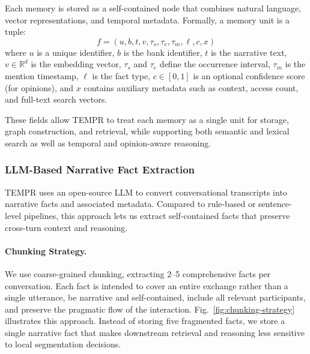 

Each memory is stored as a self-contained node that combines natural language, vector representations, and temporal metadata. Formally, a memory unit is a tuple:
\begin{equation}
f = (u, b, t, v, \tau_s, \tau_e, \tau_m, \ell, c, x)
\end{equation}
where $u$ is a unique identifier, $b$ is the bank identifier, $t$ is the narrative text, $v \in \mathbb{R}^d$ is the embedding vector, $\tau_s$ and $\tau_e$ define the occurrence interval, $\tau_m$ is the mention timestamp, $\ell$ is the fact type, $c \in [0,1]$ is an optional confidence score (for opinions), and $x$ contains auxiliary metadata such as context, access count, and full-text search vectors.

These fields allow TEMPR to treat each memory as a single unit for storage, graph construction, and retrieval, while supporting both semantic and lexical search as well as temporal and opinion-aware reasoning.

\subsubsection{LLM-Based Narrative Fact Extraction}

TEMPR uses an open-source LLM to convert conversational transcripts into narrative facts and associated metadata. Compared to rule-based or sentence-level pipelines, this approach lets us extract self-contained facts that preserve cross-turn context and reasoning.

\paragraph{Chunking Strategy.}
We use coarse-grained chunking, extracting 2--5 comprehensive facts per conversation. Each fact is intended to cover an entire exchange rather than a single utterance, be narrative and self-contained, include all relevant participants, and preserve the pragmatic flow of the interaction.
Fig.~\ref{fig:chunking-strategy} illustrates this approach. Instead of storing five fragmented facts, we store a single narrative fact that makes downstream retrieval and reasoning less sensitive to local segmentation decisions.


